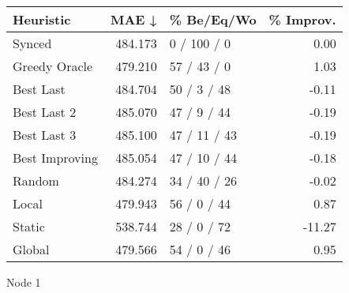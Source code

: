 \begin{tabular}{lrlr}
\toprule
\textbf{Heuristic} & \textbf{MAE ↓} & \textbf{\% Be/Eq/Wo} & \textbf{\% Improv.} \\
\midrule
            Synced &        484.173 &          0 / 100 / 0 &                0.00 \\
     Greedy Oracle &        479.210 &          57 / 43 / 0 &                1.03 \\
         Best Last &        484.704 &          50 / 3 / 48 &               -0.11 \\
       Best Last 2 &        485.070 &          47 / 9 / 44 &               -0.19 \\
       Best Last 3 &        485.100 &         47 / 11 / 43 &               -0.19 \\
    Best Improving &        485.054 &         47 / 10 / 44 &               -0.18 \\
            Random &        484.274 &         34 / 40 / 26 &               -0.02 \\
             Local &        479.943 &          56 / 0 / 44 &                0.87 \\
            Static &        538.744 &          28 / 0 / 72 &              -11.27 \\
            Global &        479.566 &          54 / 0 / 46 &                0.95 \\
\bottomrule
\end{tabular}
\caption{Node 1}
\label{tab:iid_lr05_le1_bs2_1}

